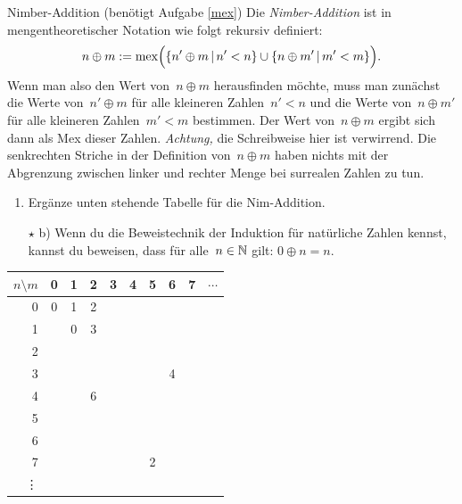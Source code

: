 \documentclass{zirkelblatt}
\begin{document}
\begin{aufgabe}{Nimber-Addition (benötigt Aufgabe \ref{mex})}
\label{nimber-addition}
Die \emph{Nimber-Addition} ist in mengentheoretischer Notation wie folgt rekursiv definiert:
\[ n \oplus m := \operatorname{mex}\Bigl(\left\{n' \oplus m \,|\, n' < n\right\} \cup
\left\{n \oplus m' \,|\, m' < m\right\}\Bigr). \]
Wenn man also den Wert von~$n \oplus m$ herausfinden möchte, muss man zunächst
die Werte von~$n' \oplus m$ für alle kleineren Zahlen~$n' < n$ und die Werte
von~$n \oplus m'$ für alle kleineren Zahlen~$m' < m$ bestimmen. Der Wert
von~$n \oplus m$ ergibt sich dann als Mex dieser Zahlen. \emph{Achtung,} die
Schreibweise hier ist verwirrend. Die senkrechten Striche in der Definition
von~$n \oplus m$ haben nichts mit der Abgrenzung zwischen linker und rechter
Menge bei surrealen Zahlen zu tun.
\begin{enumerate}
\item Ergänze unten stehende Tabelle für die Nim-Addition.
\item[$\star$ b)] Wenn du die Beweistechnik der Induktion für natürliche Zahlen kennst, kannst
du beweisen, dass für alle~$n \in \mathbb{N}$ gilt: $0 \oplus n = n$.
\end{enumerate}
\begin{center}
  \begin{tabular}{r|ccccccccl}
    $n \setminus m$ & 0 & 1 & 2 & 3 & 4 & 5 & 6 & 7 & $\cdots$ \\\hline
    0 & 0 & 1 & 2 \\
    1 &   & 0 & 3 \\
    2 & \\
    3 & & & & & & & 4 \\
    4 & & & 6 \\
    5 & \\
    6 & \\
    7 & & & & & & 2 \\
    \vdots
  \end{tabular}
\end{center}
\end{aufgabe}
\end{document}
